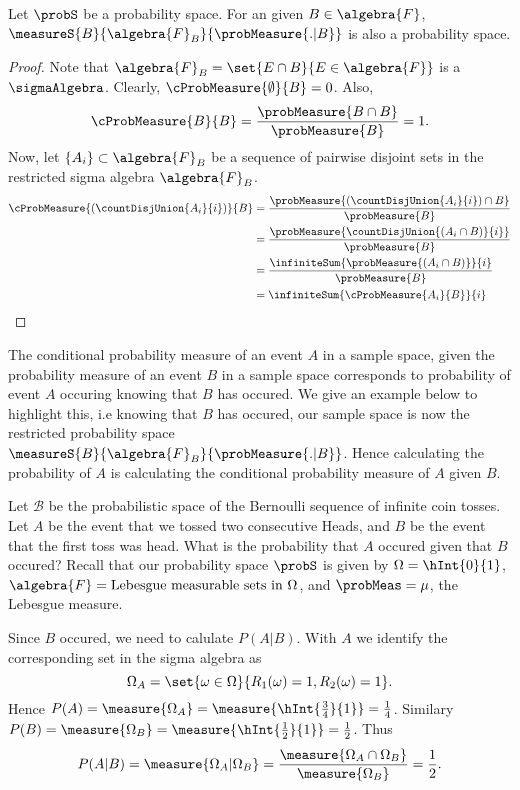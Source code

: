 \begin{Theorem}[name=Conditioned probability space]
    Let $\probS$ be a probability space. For an given $B \in \algebra{F}$, 
    $\measureS{B}{\algebra{F}_{B}}{\probMeasure{.|B}}$ is also a probability space.
\end{Theorem}
\begin{proof}
    Note that $\algebra{F}_{B} = \set{E\cap B}{E \in \algebra{F}}$ is a $\sigmaAlgebra$.
    Clearly, $\cProbMeasure{\emptyset}{B} = 0$. Also,
    \[\cProbMeasure{B}{B} = \frac{\probMeasure{B\cap B}}{\probMeasure{B}} = 1.\]
    Now, let $\lbrace A_i \rbrace \subset \algebra{F}_{B}$ be a sequence of pairwise disjoint sets in the
    restricted sigma algebra $\algebra{F}_{B}$.
    \begin{align*}
	\cProbMeasure{(\countDisjUnion{A_i}{i})}{B} &= 
	\frac{\probMeasure{(\countDisjUnion{A_i}{i})\cap B}}{\probMeasure{B}} \\
	&= \frac{\probMeasure{\countDisjUnion{(A_i\cap B)}{i}}}{\probMeasure{B}} \\
	&= \frac{\infiniteSum{\probMeasure{(A_i\cap B)}}{i}}{\probMeasure{B}} \\
	&= \infiniteSum{\cProbMeasure{A_i}{B}}{i} \\
    \end{align*}
\end{proof}
The conditional probability measure of an event $A$ in a sample space, given the probability measure of an
event $B$ in a sample space corresponds to probability of event $A$ occuring knowing that $B$ has occured. We
give an example below to highlight this, i.e knowing that $B$ has occured, our sample space is now the
restricted probability space $\measureS{B}{\algebra{F}_{B}}{\probMeasure{.|B}}$. Hence calculating the
probability of $A$ is calculating the conditional probability measure of $A$ given $B$.
\begin{Example}\label{ex:independece_2_events}
    Let $\mathcal{B}$ be the probabilistic space of the Bernoulli sequence of infinite coin tosses. Let $A$ be
    the event that we tossed two consecutive Heads, and $B$ be the event that the first toss was head. What is
    the probability that $A$ occured given that $B$ occured? Recall that our  probability space $\probS$ 
    is given by $\Omega = \hInt{0}{1}$, $\algebra{F} = \text{Lebesgue measurable sets in $\Omega$}$, 
    and $\probMeas = \mu$, the Lebesgue measure.

    Since $B$ occured, we need to calulate $P(A|B)$. With $A$ we identify the corresponding set in the sigma
    algebra as \[\Omega_{A} = \set{\omega\in\Omega}{R_1(\omega) = 1,R_2(\omega) =1}.\]
    Hence $P(A) = \measure{\Omega_{A}} = \measure{\hInt{\frac{3}{4}}{1}} = \frac{1}{4}$.
    Similary $P(B) = \measure{\Omega_{B}} = \measure{\hInt{\frac{1}{2}}{1}} = \frac{1}{2}$.
    Thus \[P(A | B) = \measure{\Omega_A|\Omega_B} = 
	\frac{\measure{\Omega_{A} \cap \Omega_{B}}}{\measure{\Omega_{B}}} = \frac{1}{2}.\]
\end{Example}
